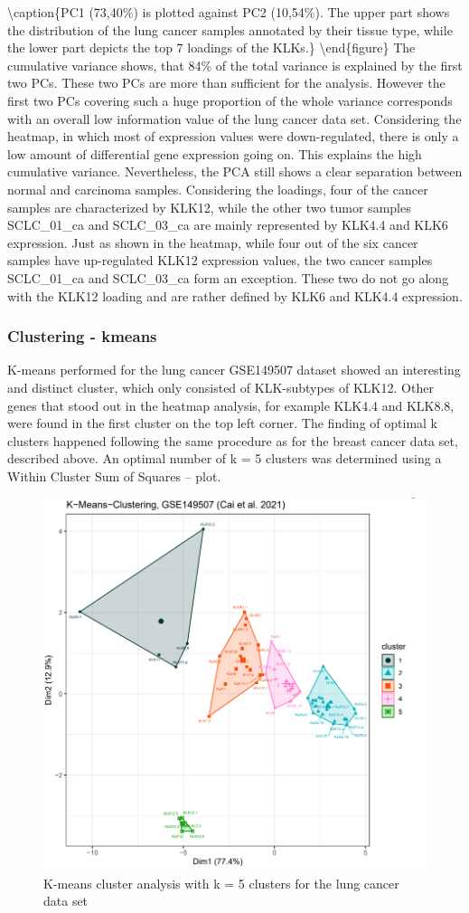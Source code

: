 \documentclass[
]{article}
\begin{document}
\textbackslash caption\{PC1 (73,40\%) is plotted against PC2 (10,54\%).
The upper part shows the distribution of the lung cancer samples
annotated by their tissue type, while the lower part depicts the top 7
loadings of the KLKs.\}\label{fig:PCA plot - lung }
\textbackslash end\{figure\} The cumulative variance shows, that 84\% of
the total variance is explained by the first two PCs. These two PCs are
more than sufficient for the analysis. However the first two PCs
covering such a huge proportion of the whole variance corresponds with
an overall low information value of the lung cancer data set.
Considering the heatmap, in which most of expression values were
down-regulated, there is only a low amount of differential gene
expression going on. This explains the high cumulative variance.
Nevertheless, the PCA still shows a clear separation between normal and
carcinoma samples. Considering the loadings, four of the cancer samples
are characterized by KLK12, while the other two tumor samples
SCLC\_01\_ca and SCLC\_03\_ca are mainly represented by KLK4.4 and KLK6
expression. Just as shown in the heatmap, while four out of the six
cancer samples have up-regulated KLK12 expression values, the two cancer
samples SCLC\_01\_ca and SCLC\_03\_ca form an exception. These two do
not go along with the KLK12 loading and are rather defined by KLK6 and
KLK4.4 expression.

\hypertarget{clustering---kmeans}{%
\subsubsection{Clustering - kmeans}\label{clustering---kmeans}}

K-means performed for the lung cancer GSE149507 dataset showed an
interesting and distinct cluster, which only consisted of KLK-subtypes
of KLK12. Other genes that stood out in the heatmap analysis, for
example KLK4.4 and KLK8.8, were found in the first cluster on the top
left corner. The finding of optimal k clusters happened following the
same procedure as for the breast cancer data set, described above. An
optimal number of k = 5 clusters was determined using a Within Cluster
Sum of Squares -- plot.

\begin{figure}

{\centering \includegraphics[width=0.5\linewidth]{images/kmeans_5_lung} 

}

\caption{K-means cluster analysis with k = 5 clusters for the lung cancer data set}\label{fig:K-means plot - lung }
\end{figure}
\end{document}
